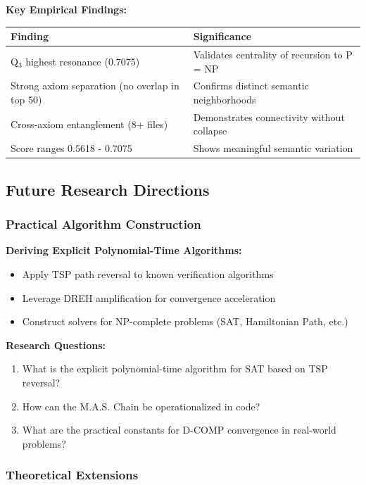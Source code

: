 \documentclass[11pt, letterpaper]{article}
\begin{document}
\textbf{Key Empirical Findings:}
\begin{table}[h]
\centering
\begin{tabular}{ll}
\toprule
Finding & Significance \\
\midrule
Q$_3$ highest resonance (0.7075) & Validates centrality of recursion to P = NP \\
Strong axiom separation (no overlap in top 50) & Confirms distinct semantic neighborhoods \\
Cross-axiom entanglement (8+ files) & Demonstrates connectivity without collapse \\
Score ranges 0.5618 - 0.7075 & Shows meaningful semantic variation \\
\bottomrule
\end{tabular}
\end{table}

\subsection{Future Research Directions}

\subsubsection{Practical Algorithm Construction}

\textbf{Deriving Explicit Polynomial-Time Algorithms:}
\begin{itemize}
    \item Apply TSP path reversal to known verification algorithms
    \item Leverage DREH amplification for convergence acceleration
    \item Construct solvers for NP-complete problems (SAT, Hamiltonian Path, etc.)
\end{itemize}

\textbf{Research Questions:}
\begin{enumerate}
    \item What is the explicit polynomial-time algorithm for SAT based on TSP reversal?
    \item How can the M.A.S. Chain be operationalized in code?
    \item What are the practical constants for D-COMP convergence in real-world problems?
\end{enumerate}

\subsubsection{Theoretical Extensions}
\end{document}
